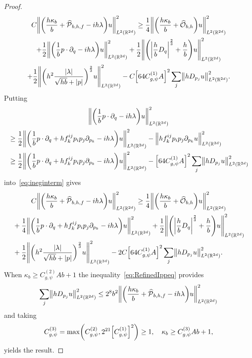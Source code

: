 \documentclass[AHL,Unicode,longabstracts]{cedram}
\newcommand{\R}{\mathbb{R}}
\newcommand{\clO}{\mathcal{O}}
\newcommand{\clP}{\mathcal{P}}
\let\oldhat\hat
\renewcommand*{\hat}[1]{\mathchoice{\widehat{#1}}{\widehat{#1}}{\oldhat{#1}}{\oldhat{#1}}}
\let\originalleft\left
\let\originalright\right
\renewcommand{\left}{\mathopen{}\mathclose\bgroup\originalleft}
\renewcommand{\right}{\aftergroup\egroup\originalright}
\begin{document}
\begin{proof}
\begin{multline}\label{eq:ineginterm}
C \left\| \left(\frac{ h \kappa_b}{b} + \hat{\clP}_{b,h,f} - ih\lambda \right) u \right\|_{L^2(\R^{2d})}^{2} \geq \frac{1}{4} \left\| \left(\frac{h\kappa_b}{b}+\hat{\clO}_{b,h}\right) u \right\|_{L^2(\R^{2d})}^{2}
\\+ \frac{1}{2}\left\| \left(\frac{1}{b} p\cdot\partial_q-i h\lambda \right)u \right\|_{L^2(\R^{2d})}^{2} + \frac{1}{2}\left\| \left(\left|\frac{h}{b}D_{q} \right|^{\frac{2}{3}} + \frac{h}{b}\right) u \right\|_{L^2(\R^{2d})}^{2}
\\
+ \frac{1}{2}\left\| \left(h^2 \frac{|\lambda|}{\sqrt{hb}+|p|} \right)^{\frac{2}{3}} u \right\|_{L^2(\R^{2d})}^{2} - C \left[64C_{g,\psi}^{(1)}A\right]^{2}\sum_{j} \left\| hD_{p_{j}}u \right\|_{L^2(\R^{2d})}^{2}.
\end{multline}
Putting
\begin{multline*}
\left\| \left(\frac{1}{b} p\cdot\partial_q-i h\lambda \right)u \right\|_{L^2(\R^{2d})}^{2}\\
\begin{aligned}
&\geq
\frac{1}{2}\left\| \left(\frac{1}{b} p\cdot\partial_q +hf^{ij}_{k}p_i p_j \partial_{p_k}-i h\lambda \right)u \right\|_{L^2(\R^{2d})}^{2}
-\left\| h f^{ij}_{k}p_i p_j \partial_{p_k}u \right\|_{L^2(\R^{2d})}^{2}\\
&\geq \frac{1}{2}\left\| \left(\frac{1}{b} p\cdot\partial_q +hf^{ij}_{k}p_i p_j \partial_{p_k}-i h\lambda \right)u \right\|_{L^2(\R^{2d})}^{2}
-\left[64C_{g,\psi}^{(1)}A\right]^{2}\sum_{j} \left\| hD_{p_{j}}u \right\|_{L^2(\R^{2d})}^{2}
\end{aligned}
\end{multline*}
into~\eqref{eq:ineginterm} gives
\begin{multline}\label{eq:ineginterm2}
C \left\| \left(\frac{ h \kappa_b}{b} + \hat{\clP}_{b,h,f} - ih\lambda \right) u \right\|_{L^2(\R^{2d})}^{2}
\geq \frac{1}{4} \left\| \left(\frac{h\kappa_b}{b}+\hat{\clO}_{b,h}\right) u \right\|_{L^2(\R^{2d})}^{2} \\
\begin{aligned}
&+ \frac{1}{4}\left\| \left(\frac{1}{b} p\cdot\partial_q +hf^{ij}_{k}p_i p_j \partial_{p_k}-i h\lambda \right)u \right\|_{L^2(\R^{2d})}^{2}
+ \frac{1}{2}\left\| \left(\left|\frac{h}{b}D_{q} \right|^{\frac{2}{3}}+ \frac{h}{b}\right) u \right\|_{L^2(\R^{2d})}^{2}\\
& + \frac{1}{2}\left\| \left(h^2 \frac{|\lambda|}{\sqrt{hb}+|p|} \right)^{\frac{2}{3}} u \right\|_{L^2(\R^{2d})}^{2}
- 2C\left[64C_{g,\psi}^{(1)}A\right]^{2}\sum_{j} \left\| hD_{p_{j}}u \right\|_{L^2(\R^{2d})}^{2}.
\end{aligned}
\end{multline}
When $\kappa_b\geq C_{g,\psi}^{(2)}Ab+1$ the inequality~\eqref{eq:RefinedIppeq} provides
\[
\sum_j \left\| hD_{p_{j}}u \right\|_{L^2(\R^{2d})}^{2}\leq 2^{8}b^2\left\| \left(\frac{ h \kappa_b}{b} + \hat{\clP}_{b,h,f} - ih\lambda \right) u \right\|_{L^2(\R^{2d})}^{2}
\]
and taking
\[
C_{g,\psi}^{(3)}=\max \left(C_{g,\psi}^{(2)}, 2^{21} \left[C_{g,\psi}^{(1)}\right]^2\right)\geq 1,\quad \kappa_b\geq C_{g,\psi}^{(3)}Ab+1,
\]
yields the result.
\end{proof}
\end{document}
